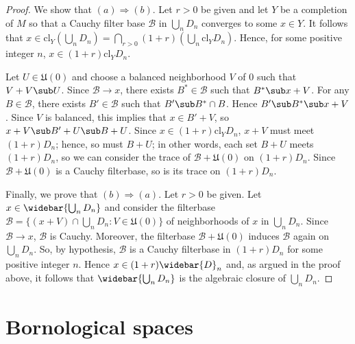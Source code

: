 \begin{proof}
We show that $(a)\Rightarrow(b)$. Let $r>0$ be given and let $Y$ be a completion of $M$ so that a Cauchy filter base $\mathcal{B}$ in $\bigcup_nD_n$ converges to some $x\in Y$. It follows that $x\in\mathrm{cl}_Y(\bigcup_nD_n)=\bigcap_{r>0}(1+r)(\bigcup_n\mathrm{cl}_YD_n)$. Hence, for some positive integer $n$, $x\in(1+r)\mathrm{cl}_YD_n$.\par
Let $U\in\mathfrak{U}(0)$ and choose a balanced neighborhood $V$ of $0$ such that $V+V\sub U$. Since $\mathcal{B}\to x$, there exists $B^*\in\mathcal{B}$ such that $B^*\sub x+V$. For any $B\in\mathcal{B}$, there exists $B'\in\mathcal{B}$ such that $B'\sub B^*\cap B$. Hence $B'\sub B^*\sub x+V$. Since $V$ is balanced, this implies that $x\in B'+V$, so $x+V\sub B'+U\sub B+U$. Since $x\in(1+r)\mathrm{cl}_YD_n$, $x+V$ must meet $(1+r)D_n$; hence, so must $B+U$; in other words, each set $B+U$ meets $(1+r)D_n$, so we can consider the trace of $\mathcal{B}+\mathfrak{U}(0)$ on $(1+r)D_n$. Since $\mathcal{B}+\mathfrak{U}(0)$ is a Cauchy filterbase, so is its trace on $(1+r)D_n$.\par
Finally, we prove that $(b)\Rightarrow(a)$. Let $r>0$ be given. Let $x\in\widebar{\bigcup_nD_n}$ and consider the filterbase $\mathcal{B}=\{(x+V)\cap\bigcup_nD_n:V\in\mathfrak{U}(0)\}$ of neighborhoods of $x$ in $\bigcup_nD_n$. Since $\mathcal{B}\to x$, $\mathcal{B}$ is Cauchy. Moreover, the filterbase $\mathcal{B}+\mathfrak{U}(0)$ induces $\mathcal{B}$ again on $\bigcup_nD_n$. So, by hypothesis, $\mathcal{B}$ is a Cauchy filterbase in $(1+r)D_n$ for some positive integer $n$. Hence $x\in(1+r)\widebar{D}_n$ and, as argued in the proof above, it follows that $\widebar{\bigcup_nD_n}$ is the algebraic closure of $\bigcup_nD_n$.
\end{proof}
\chapter{Bornological spaces}
